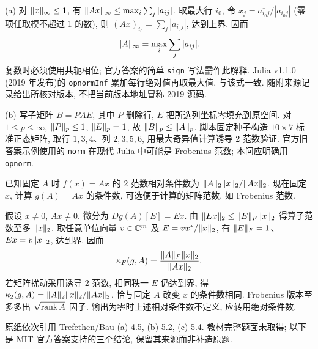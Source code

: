 \begin{solution}
(a) 对 $\lVert x\rVert_\infty\le1$, 有 $\lVert Ax\rVert_\infty\le\max_i\sum_j|a_{ij}|$. 取最大行 $i_0$, 令 $x_j=\overline{a_{i_0j}}/|a_{i_0j}|$ (零项任取模不超过 1 的数), 则 $(Ax)_{i_0}=\sum_j|a_{i_0j}|$, 达到上界. 因而
\[
 \lVert A\rVert_\infty=\max_i\sum_j|a_{ij}|.
\]
复数时必须使用共轭相位; 官方答案的简单 \texttt{sign} 写法需作此解释. Julia v1.1.0 (2019 年发布)的 \texttt{opnormInf} 累加每行绝对值再取最大值, 与该式一致. 随附来源记录给出所核对版本, 不把当前版本地址冒称 2019 源码.

(b) 写子矩阵 $B=P A E$, 其中 $P$ 删除行, $E$ 把所选列坐标零填充到原空间. 对 $1\le p\le\infty$, $\lVert P\rVert_p\le1$, $\lVert E\rVert_p=1$, 故 $\lVert B\rVert_p\le\lVert A\rVert_p$. 脚本固定种子构造 $10\times7$ 标准正态矩阵, 取行 $1,3,4$、列 $2,3,5,6$, 用最大奇异值计算诱导 2 范数验证. 官方旧答案示例使用的 \texttt{norm} 在现代 Julia 中可能是 Frobenius 范数; 本问应明确用 \texttt{opnorm}.
\end{solution}
\begin{exercise}\label{ps2:q3}
已知固定 $A$ 时 $f(x)=Ax$ 的 2 范数相对条件数为 $\lVert A\rVert_2\lVert x\rVert_2/\lVert Ax\rVert_2$. 现在固定 $x$, 计算 $g(A)=Ax$ 的条件数, 可选便于计算的矩阵范数, 如 Frobenius 范数.
\end{exercise}
\begin{solution}
假设 $x\ne0$, $Ax\ne0$. 微分为 $Dg(A)[E]=Ex$. 由 $\lVert Ex\rVert_2\le\lVert E\rVert_F\lVert x\rVert_2$ 得算子范数至多 $\lVert x\rVert_2$. 取任意单位向量 $v\in\mathbb C^m$ 及 $E=vx^*/\lVert x\rVert_2$, 有 $\lVert E\rVert_F=1$、$Ex=v\lVert x\rVert_2$, 达到界. 因而
\[
 \kappa_F(g,A)=\frac{\lVert A\rVert_F\lVert x\rVert_2}{\lVert Ax\rVert_2}.
\]
若矩阵扰动采用诱导 2 范数, 相同秩一 $E$ 仍达到界, 得 $\kappa_2(g,A)=\lVert A\rVert_2\lVert x\rVert_2/\lVert Ax\rVert_2$, 恰与固定 $A$ 改变 $x$ 的条件数相同. Frobenius 版本至多多出 $\sqrt{\operatorname{rank} A}$ 因子. 输出为零时上述相对条件数不定义, 应转用绝对条件数.
\end{solution}
\begin{exercise}\label{ps2:q4}
原纸依次引用 Trefethen/Bau (a) 4.5, (b) 5.2, (c) 5.4. 教材完整题面未取得; 以下是 MIT 官方答案支持的三个结论, 保留其来源而非补造原题.
\end{exercise}
